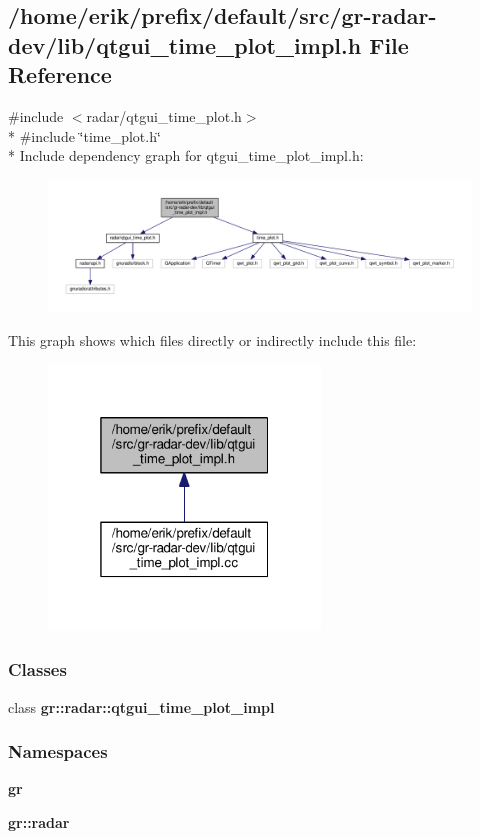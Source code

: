 \subsection{/home/erik/prefix/default/src/gr-\/radar-\/dev/lib/qtgui\+\_\+time\+\_\+plot\+\_\+impl.h File Reference}
\label{qtgui__time__plot__impl_8h}
{\ttfamily \#include $<$radar/qtgui\+\_\+time\+\_\+plot.\+h$>$}\\*
{\ttfamily \#include \char`\"{}time\+\_\+plot.\+h\char`\"{}}\\*
Include dependency graph for qtgui\+\_\+time\+\_\+plot\+\_\+impl.\+h\+:
\nopagebreak
\begin{figure}[H]
\begin{center}
\leavevmode
\includegraphics[width=350pt]{d0/d2d/qtgui__time__plot__impl_8h__incl}
\end{center}
\end{figure}
This graph shows which files directly or indirectly include this file\+:
\nopagebreak
\begin{figure}[H]
\begin{center}
\leavevmode
\includegraphics[width=205pt]{da/d68/qtgui__time__plot__impl_8h__dep__incl}
\end{center}
\end{figure}
\subsubsection*{Classes}
\begin{DoxyCompactItemize}
\item 
class {\bf gr\+::radar\+::qtgui\+\_\+time\+\_\+plot\+\_\+impl}
\end{DoxyCompactItemize}
\subsubsection*{Namespaces}
\begin{DoxyCompactItemize}
\item 
 {\bf gr}
\item 
 {\bf gr\+::radar}
\end{DoxyCompactItemize}
